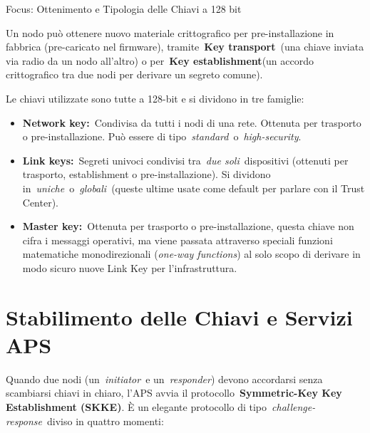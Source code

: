 \documentclass[
  italian,
  openany]{book}
\begin{document}
\begin{calloutimportant}{Focus: Ottenimento e Tipologia delle Chiavi a 128 bit}

Un nodo può ottenere nuovo materiale crittografico per pre-installazione
in fabbrica (pre-caricato nel firmware), tramite~\textbf{Key
transport}~(una chiave inviata via radio da un nodo all'altro) o
per~\textbf{Key establishment}(un accordo crittografico tra due nodi per
derivare un segreto comune).

Le chiavi utilizzate sono tutte a 128-bit e si dividono in tre famiglie:

\begin{itemize}
\item
  \textbf{Network key:}~Condivisa da tutti i nodi di una rete. Ottenuta
  per trasporto o pre-installazione. Può essere di
  tipo~\emph{standard}~o~\emph{high-security}.
\item
  \textbf{Link keys:}~Segreti univoci condivisi tra~\emph{due
  soli}~dispositivi (ottenuti per trasporto, establishment o
  pre-installazione). Si dividono
  in~\emph{uniche}~o~\emph{globali}~(queste ultime usate come default
  per parlare con il Trust Center).
\item
  \textbf{Master key:}~Ottenuta per trasporto o pre-installazione,
  questa chiave non cifra i messaggi operativi, ma viene passata
  attraverso speciali funzioni matematiche monodirezionali
  (\emph{one-way functions}) al solo scopo di derivare in modo sicuro
  nuove Link Key per l'infrastruttura.
\end{itemize}

\end{calloutimportant}

\section{Stabilimento delle Chiavi e Servizi
APS}\label{stabilimento-delle-chiavi-e-servizi-aps}

Quando due nodi (un~\emph{initiator}~e un~\emph{responder}) devono
accordarsi senza scambiarsi chiavi in chiaro, l'APS avvia il
protocollo~\textbf{Symmetric-Key Key Establishment (SKKE)}. È un
elegante protocollo di tipo~\emph{challenge-response}~diviso in quattro
momenti:
\end{document}
